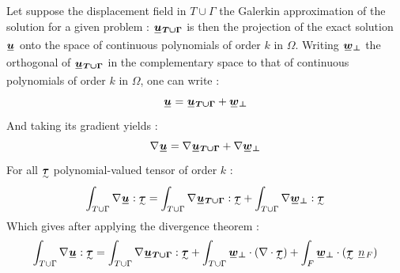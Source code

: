 \documentclass[fleqn]{article}
\begin{document}
            Let suppose the displacement field in $T \cup \Gamma$ the Galerkin approximation of the solution for a given problem : $\tensori{u}\subscript{\bm{T \cup \Gamma}}$ is then the projection of the exact solution $\tensori{u}$ onto the space of continuous polynomials of order $k$ in $\Omega$. Writing $\tensori{w}\subscript{\bm{\perp}}$ the orthogonal of $\tensori{u}\subscript{\bm{T \cup \Gamma}}$ in the complementary space to that of continuous polynomials of order $k$ in $\Omega$, one can write :
            \begin{equation}
                \tensori{u} = \tensori{u}\subscript{\bm{T \cup \Gamma}} + \tensori{w}\subscript{\bm{\perp}}
            \end{equation}
            And taking its gradient yields :
            \begin{equation}
                \nabla \tensori{u} = \nabla \tensori{u}\subscript{\bm{T \cup \Gamma}} + \nabla \tensori{w}\subscript{\bm{\perp}}
            \end{equation}
            For all $\tensorii{\tau}$ polynomial-valued tensor of order $k$ :
            \begin{equation}
                \begin{aligned}
                    \int_{T \cup \Gamma} \nabla \tensori{u} : \tensorii{\tau}
                    =
                    \int_{T \cup \Gamma} \nabla \tensori{u}\subscript{\bm{T \cup \Gamma}} : \tensorii{\tau}
                    +
                    \int_{T \cup \Gamma} \nabla \tensori{w}\subscript{\bm{\perp}} : \tensorii{\tau}
                \end{aligned}
            \end{equation}
            Which gives after applying the divergence theorem :
            \begin{equation}
                \label{eq_gradient_0}
                \begin{aligned}
                    \int_{T \cup \Gamma} \nabla \tensori{u} : \tensorii{\tau}
                    =
                    \int_{T \cup \Gamma} \nabla \tensori{u}\subscript{\bm{T \cup \Gamma}} : \tensorii{\tau}
                    +
                    \int_{T \cup \Gamma} \tensori{w}\subscript{\bm{\perp}} \cdot (\nabla \cdot \tensorii{\tau})
                    +
                    \int_{F} \tensori{w}\subscript{\bm{\perp}} \cdot (\tensorii{\tau} \ \lighttensori{n}\subscript{F})
                \end{aligned}
            \end{equation}
\end{document}
